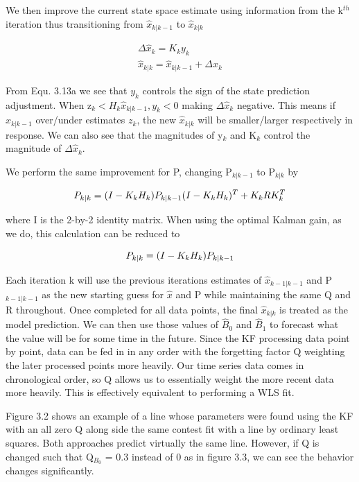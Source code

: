   We then improve the current state space estimate using information from the k$^{th}$ iteration thus transitioning from $\hat{x}_{k|k-1}$ to $\hat{x}_{k|k}$
  
  \begin{subequations}
  \begin{align}
    \Delta\hat{x}_{k} = K_{k}y_{k} \\
    \hat{x}_{k|k} = \hat{x}_{k|k-1} + \Delta\hat{x}_{k}
    \end{align}
   \end{subequations}

From Equ. 3.13a we see that $y_{k}$ controls the sign of the state prediction adjustment. When z$_{k} < H_{k}\hat{x}_{k|k-1}, y_{k} < 0$ making $\Delta\hat{x}_{k}$ negative. This means if $\hat{x}_{k|k-1}$ over/under estimates $z_k$, the new $\hat{x}_{k|k}$ will be smaller/larger respectively in response. We can also see that the magnitudes of y$_{k}$ and K$_{k}$ control the magnitude of $\Delta\hat{x}_{k}$.

We perform the same improvement for P, changing P$_{k|k-1}$ to P$_{k|k}$ by

\begin{equation} 
\centering
P_{k|k} = (I - K_{k}H_{k})P_{k|k-1}(I - K_{k}H_{k})^{T} + K_{k}RK_{k}^{T}
\end{equation}

where I is the 2-by-2 identity matrix. When using the optimal Kalman gain, as we do, this calculation can be reduced to 

\begin{equation} 
\centering
P_{k|k} = (I - K_{k}H_{k})P_{k|k-1}
\end{equation}

Each iteration k will use the previous iterations estimates of $\hat{x}_{k-1|k-1}$ and P$_{k-1|k-1}$ as the new starting guess for $\hat{x}$ and P while maintaining the same Q and R throughout. Once completed for all data points, the final $\hat{x}_{k|k}$ is treated as the model prediction. We can then use those values of $\hat{B}_{0}$ and $\hat{B}_{1}$ to forecast what the value will be for some time in the future. Since the KF processing data point by point, data can be fed in in any order with the forgetting factor Q weighting the later processed points more heavily. Our time series data comes in chronological order, so Q allows us to essentially weight the more recent data more heavily. This is effectively equivalent to performing a WLS fit.

Figure 3.2 shows an example of a line whose parameters were found using the KF with an all zero Q along side the same contest fit with a line by ordinary least squares. Both approaches predict virtually the same line. However, if Q is changed such that Q$_{B_{0}}$ = 0.3  instead of 0 as in figure 3.3, we can see the behavior changes significantly.

